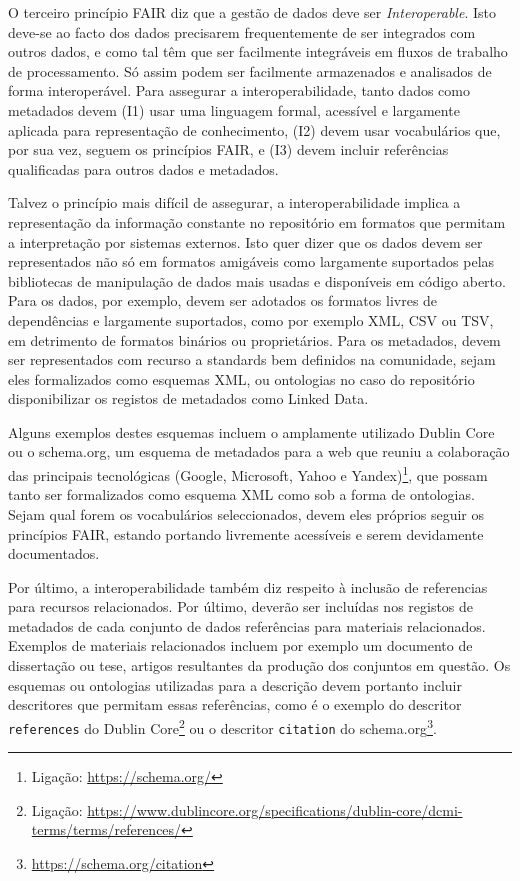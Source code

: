 \documentclass[sigconf,nonacm]{acmart}
\begin{document}
O terceiro princípio FAIR diz que a gestão de dados deve ser \emph{Interoperable}. Isto deve-se ao facto dos dados precisarem frequentemente de ser integrados com outros dados, e como tal têm que ser facilmente integráveis em fluxos de trabalho de processamento. Só assim podem ser facilmente armazenados e analisados de forma interoperável. Para assegurar a interoperabilidade, tanto dados como metadados devem (I1) usar uma linguagem formal, acessível e largamente aplicada para representação de conhecimento, (I2) devem usar vocabulários que, por sua vez, seguem os princípios FAIR, e (I3) devem incluir referências qualificadas para outros dados e metadados.

Talvez o princípio mais difícil de assegurar, a interoperabilidade implica a representação da informação constante no repositório em formatos que permitam a interpretação por sistemas externos. Isto quer dizer que os dados devem ser representados não só em formatos amigáveis como largamente suportados pelas bibliotecas de manipulação de dados mais usadas e disponíveis em código aberto. Para os dados, por exemplo, devem ser adotados os formatos livres de dependências e largamente suportados, como por exemplo XML, CSV ou TSV, em detrimento de formatos binários ou proprietários. Para os metadados, devem ser representados com recurso a standards bem definidos na comunidade, sejam eles formalizados como esquemas XML, ou ontologias no caso do repositório disponibilizar os registos de metadados como Linked Data. 

Alguns exemplos destes esquemas incluem o amplamente utilizado Dublin Core ou o schema.org, um esquema de metadados para a web que reuniu a colaboração das principais tecnológicas (Google, Microsoft, Yahoo e Yandex)\footnote{Ligação: \url{https://schema.org/}}, que possam tanto ser formalizados como esquema XML como sob a forma de ontologias. Sejam qual forem os vocabulários seleccionados, devem eles próprios seguir os princípios FAIR, estando portando livremente acessíveis e serem devidamente documentados. 

Por último, a interoperabilidade também diz respeito à inclusão de referencias para recursos relacionados. Por último, deverão ser incluídas nos registos de metadados de cada conjunto de dados referências para materiais relacionados. Exemplos de materiais relacionados incluem por exemplo um documento de dissertação ou tese, artigos resultantes da produção dos conjuntos em questão. Os esquemas ou ontologias utilizadas para a descrição devem portanto incluir descritores que permitam essas referências, como é o exemplo do descritor \texttt{references} do Dublin Core\footnote{Ligação: \url{https://www.dublincore.org/specifications/dublin-core/dcmi-terms/terms/references/}} ou o descritor \texttt{citation} do schema.org\footnote{\url{https://schema.org/citation}}.
\end{document}
